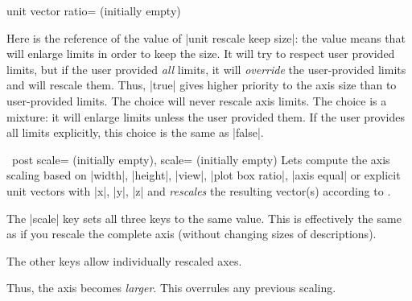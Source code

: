 \begin{pgfplotskey}{unit vector ratio= (initially empty)}
\begin{pgfplotskeylist}
        Here is the reference of the value of |unit rescale keep size|: the
        value  means that \PGFPlots{} will enlarge limits in
        order to keep the size. It will try to respect user provided limits,
        but if the user provided \emph{all} limits, it will \emph{override} the
        user-provided limits and will rescale them. Thus, |true| gives higher
        priority to the axis size than to user-provided limits. The choice
         will never rescale axis limits. The choice
         is a mixture: it will enlarge
        limits unless the user provided them. If the user provides all limits
        explicitly, this choice is the same as |false|.
    \end{pgfplotskeylist}
\end{pgfplotskey}

\begin{pgfplotsxykeylist}{%
    \x\ post scale= (initially empty),
    scale= (initially empty)%
}
    Lets \PGFPlots{} compute the axis scaling based on |width|, |height|,
    |view|, |plot box ratio|, |axis equal| or explicit unit vectors with |x|,
    |y|, |z| and \emph{rescales} the resulting vector(s) according to
    .

    The |scale| key sets all three keys to the same  value.
    This is effectively the same as if you rescale the complete axis (without
    changing sizes of descriptions).

    The other keys allow individually rescaled axes.
\begin{codeexample}[]
\end{codeexample}
    Thus, the axis becomes \emph{larger}. This overrules any previous scaling.

\begin{codeexample}[]
\end{codeexample}
\end{pgfplotsxykeylist}


